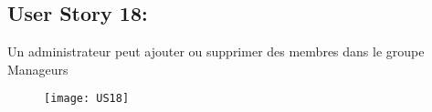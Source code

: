 \newpage
\subsection{User Story 18:}
Un administrateur peut ajouter ou supprimer des membres dans le groupe Manageurs


\begin{figure}[!h]
  \begin{center}
        \texttt{[image: US18]}
        \label{US18-dia}
  \end{center}
\end{figure}
